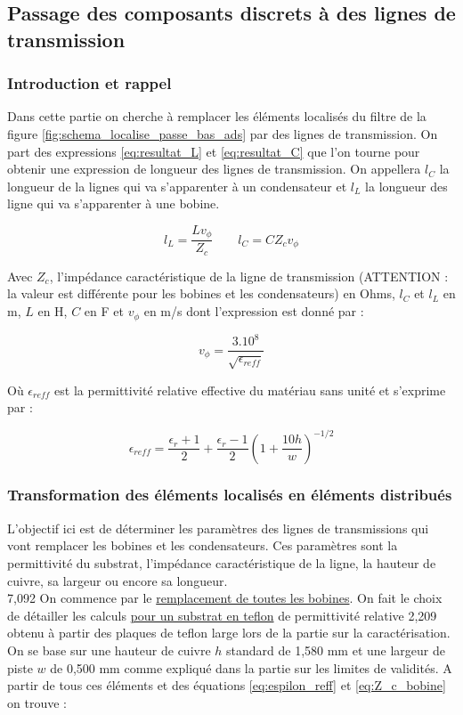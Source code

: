 \documentclass[french]{article}
\begin{document}
\subsection{Passage des composants discrets à des lignes de transmission}

\subsubsection{Introduction et rappel}

Dans cette partie on cherche à remplacer les éléments localisés du filtre de la figure \ref{fig:schema_localise_passe_bas_ads} par des lignes de transmission. On part des expressions \ref{eq:resultat_L} et \ref{eq:resultat_C} que l'on tourne pour obtenir une expression de longueur des lignes de transmission. On appellera $l_C$ la longueur de la lignes qui va s'apparenter à un condensateur et $l_L$ la longueur des ligne qui va s'apparenter à une bobine.

\begin{equation}
	l_L = \frac{L v_\phi}{Z_c}
	\qquad
	l_C = C Z_c v_\phi
	\label{eq:expression_l}
\end{equation}

Avec $Z_c$, l'impédance caractéristique de la ligne de transmission (ATTENTION : la valeur est différente pour les bobines et les condensateurs) en Ohms, $l_C$ et $l_L$ en m, $L$ en H, $C$ en F et $v_\phi$ en m/s dont l'expression est donné par :

\begin{equation}
	v_\phi = \frac{3.10^8}{\sqrt{\epsilon_{reff}}}
\end{equation}

Où $\epsilon_{reff}$ est la permittivité relative effective du matériau sans unité et s'exprime par : 

\begin{equation}
	\epsilon_{reff} = \frac{\epsilon_r + 1}{2} + \frac{\epsilon_r - 1}{2}\left(1 + \frac{10h}{w}\right)^{-1/2}
	\label{eq:espilon_reff}
\end{equation}


\subsubsection{Transformation des éléments localisés en éléments distribués}

L'objectif ici est de déterminer les paramètres des lignes de transmissions qui vont remplacer les bobines et les condensateurs. Ces paramètres sont la permittivité du substrat, l'impédance caractéristique de la ligne, la hauteur de cuivre, sa largeur ou encore sa longueur.\\
7,092
On commence par le \underline{remplacement de toutes les bobines}. On fait le choix de détailler les calculs \underline{pour un substrat en teflon} de permittivité relative 2,209 obtenu à partir des plaques de teflon large lors de la partie sur la caractérisation. On se base sur une hauteur de cuivre $h$ standard de 1,580 mm et une largeur de piste $w$ de 0,500 mm comme expliqué dans la partie sur les limites de validités. A partir de tous ces éléments et des équations \ref{eq:espilon_reff} et \ref{eq:Z_c_bobine} on trouve :
\end{document}
